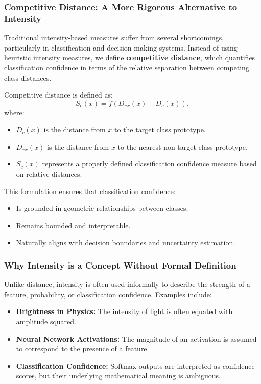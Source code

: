 \subsubsection{Competitive Distance: A More Rigorous Alternative to Intensity}

Traditional intensity-based measures suffer from several shortcomings, particularly in classification and decision-making systems. Instead of using heuristic intensity measures, we define \textbf{competitive distance}, which quantifies classification confidence in terms of the relative separation between competing class distances.

Competitive distance is defined as:
\[
    S_c(x) = f(D_{\neg c}(x) - D_c(x)),
\]
where:
\begin{itemize}
    \item \( D_c(x) \) is the distance from \( x \) to the target class prototype.
    \item \( D_{\neg c}(x) \) is the distance from \( x \) to the nearest non-target class prototype.
    \item \( S_c(x) \) represents a properly defined classification confidence measure based on relative distances.
\end{itemize}

This formulation ensures that classification confidence:
\begin{itemize}
    \item Is grounded in geometric relationships between classes.
    \item Remains bounded and interpretable.
    \item Naturally aligns with decision boundaries and uncertainty estimation.
\end{itemize}


\subsubsection{Why Intensity is a Concept Without Formal Definition}

Unlike distance, intensity is often used informally to describe the strength of a feature, probability, or classification confidence. Examples include:

\begin{itemize}
    \item \textbf{Brightness in Physics:} The intensity of light is often equated with amplitude squared.
    \item \textbf{Neural Network Activations:} The magnitude of an activation is assumed to correspond to the presence of a feature.
    \item \textbf{Classification Confidence:} Softmax outputs are interpreted as confidence scores, but their underlying mathematical meaning is ambiguous.
\end{itemize}

